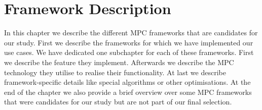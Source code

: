 \label{Framework Desciption}	
\chapter{Framework Description}
In this chapter we describe the different MPC frameworks that are candidates for our study. First we describe the frameworks for which we have implemented our use cases. We have dedicated one subchapter for each of these frameworks.
First we describe the feature they implement. Afterwards we describe the MPC technology they utilise to realise their functionality. At last we describe framework-specific details like special algorithms or other optimisations. At the end of the chapter we also provide a brief overview over some MPC frameworks that were candidates for our study but are not part of our final selection.

